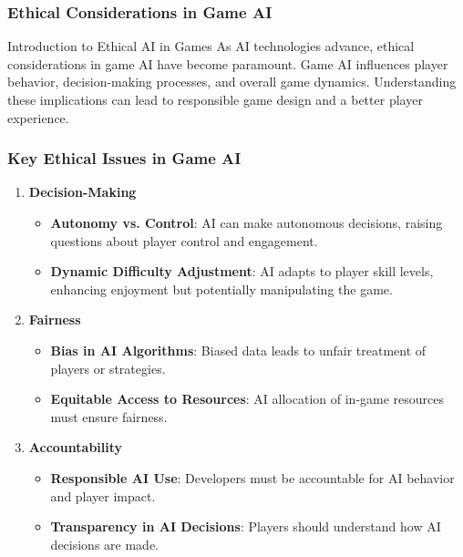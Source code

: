 \documentclass[aspectratio=169]{beamer}
\begin{document}
\begin{frame}[fragile]
    \frametitle{Ethical Considerations in Game AI}
    
    \begin{block}{Introduction to Ethical AI in Games}
        As AI technologies advance, ethical considerations in game AI have become paramount.
        Game AI influences player behavior, decision-making processes, and overall game dynamics.
        Understanding these implications can lead to responsible game design and a better player experience.
    \end{block}
\end{frame}

\begin{frame}[fragile]
    \frametitle{Key Ethical Issues in Game AI}
    
    \begin{enumerate}
        \item \textbf{Decision-Making}
            \begin{itemize}
                \item \textbf{Autonomy vs. Control}: AI can make autonomous decisions, raising questions about player control and engagement.
                \item \textbf{Dynamic Difficulty Adjustment}: AI adapts to player skill levels, enhancing enjoyment but potentially manipulating the game. 
            \end{itemize}
        \item \textbf{Fairness}
            \begin{itemize}
                \item \textbf{Bias in AI Algorithms}: Biased data leads to unfair treatment of players or strategies.
                \item \textbf{Equitable Access to Resources}: AI allocation of in-game resources must ensure fairness.
            \end{itemize}
        \item \textbf{Accountability}
            \begin{itemize}
                \item \textbf{Responsible AI Use}: Developers must be accountable for AI behavior and player impact.
                \item \textbf{Transparency in AI Decisions}: Players should understand how AI decisions are made.
            \end{itemize}
    \end{enumerate}
\end{frame}
\end{document}
